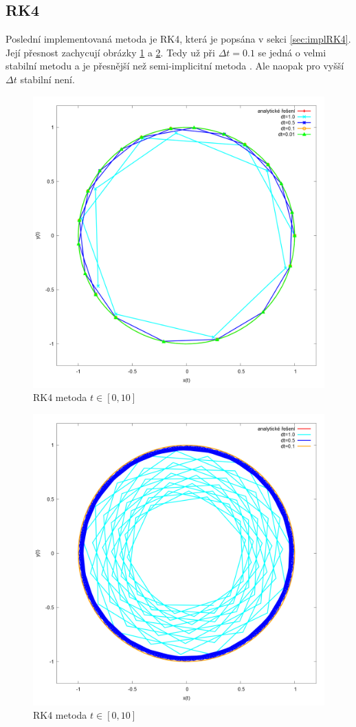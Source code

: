 \subsection{RK4}
Poslední implementovaná metoda je RK4, která je popsána v sekci \ref{sec:implRK4}. Její přesnost zachycují obrázky \ref{fig:RK4} a \ref{fig:RK4Stab}. Tedy už při $ \Delta t=0.1 $ se jedná o velmi stabilní metodu a je přesnější než semi-implicitní metoda . Ale naopak pro vyšší  $ \Delta t$ stabilní není.
\begin{figure}
	\caption{RK4 metoda $ t\in [0,10] $}
	\label{fig:RK4} 
	\centering
	\includegraphics[width=\linewidth]{Figs/RK4}
\end{figure}
\begin{figure}
	\caption{RK4 metoda $ t\in [0,10] $}
	\label{fig:RK4Stab} 
	\centering
	\includegraphics[width=\linewidth]{Figs/RK4Stab}
\end{figure}
